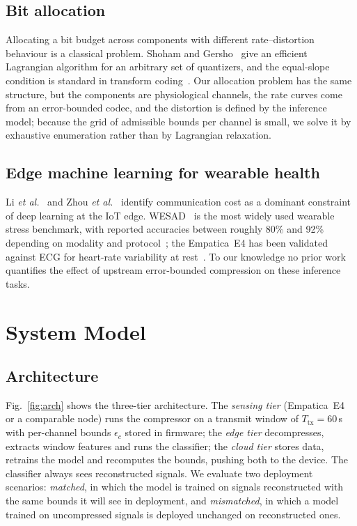 \documentclass[journal]{IEEEtran}
\begin{document}
\subsection{Bit allocation}
Allocating a bit budget across components with different rate--distortion behaviour is a classical problem. Shoham and Gersho~\cite{shoham1988} give an efficient Lagrangian algorithm for an arbitrary set of quantizers, and the equal-slope condition is standard in transform coding~\cite{gersho1992}. Our allocation problem has the same structure, but the components are physiological channels, the rate curves come from an error-bounded codec, and the distortion is defined by the inference model; because the grid of admissible bounds per channel is small, we solve it by exhaustive enumeration rather than by Lagrangian relaxation.

\subsection{Edge machine learning for wearable health}
Li \emph{et al.}~\cite{li2018} and Zhou \emph{et al.}~\cite{zhou2019} identify communication cost as a dominant constraint of deep learning at the IoT edge. WESAD~\cite{schmidt2018} is the most widely used wearable stress benchmark, with reported accuracies between roughly 80\% and 92\% depending on modality and protocol~\cite{sipele2023}; the Empatica~E4 has been validated against ECG for heart-rate variability at rest~\cite{schuurmans2020}. To our knowledge no prior work quantifies the effect of upstream error-bounded compression on these inference tasks.

\section{System Model}
\subsection{Architecture}
Fig.~\ref{fig:arch} shows the three-tier architecture. The \emph{sensing tier} (Empatica~E4 or a comparable node) runs the compressor on a transmit window of $T_{\mathrm{tx}}=60$\,s with per-channel bounds $\epsilon_c$ stored in firmware; the \emph{edge tier} decompresses, extracts window features and runs the classifier; the \emph{cloud tier} stores data, retrains the model and recomputes the bounds, pushing both to the device. The classifier always sees reconstructed signals. We evaluate two deployment scenarios: \emph{matched}, in which the model is trained on signals reconstructed with the same bounds it will see in deployment, and \emph{mismatched}, in which a model trained on uncompressed signals is deployed unchanged on reconstructed ones.
\end{document}
